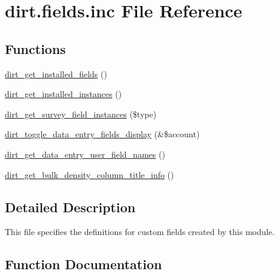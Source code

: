 \hypertarget{dirt_8fields_8inc}{}\section{dirt.\+fields.\+inc File Reference}
\label{dirt_8fields_8inc}
\subsection*{Functions}
\begin{DoxyCompactItemize}
\item 
\mbox{\hyperlink{dirt_8fields_8inc_a681957a0f276662e3fce712e5e14c11f}{dirt\+\_\+get\+\_\+installed\+\_\+fields}} ()
\item 
\mbox{\hyperlink{dirt_8fields_8inc_ad3d38e927006f5a6e57dd0016ead4d49}{dirt\+\_\+get\+\_\+installed\+\_\+instances}} ()
\item 
\mbox{\hyperlink{dirt_8fields_8inc_af0165a93ae54185d03d79d6a738fe204}{dirt\+\_\+get\+\_\+survey\+\_\+field\+\_\+instances}} (\$type)
\item 
\mbox{\hyperlink{dirt_8fields_8inc_ac3424e2d07f35121bba295a746a50fa5}{dirt\+\_\+toggle\+\_\+data\+\_\+entry\+\_\+fields\+\_\+display}} (\&\$account)
\item 
\mbox{\hyperlink{dirt_8fields_8inc_a2b6ec10e6817d4be9ac6788a657e05c1}{dirt\+\_\+get\+\_\+data\+\_\+entry\+\_\+user\+\_\+field\+\_\+names}} ()
\item 
\mbox{\hyperlink{dirt_8fields_8inc_a692d5032e38cf883af47b2cb9d5a5e4e}{dirt\+\_\+get\+\_\+bulk\+\_\+density\+\_\+column\+\_\+title\+\_\+info}} ()
\end{DoxyCompactItemize}


\subsection{Detailed Description}
This file specifies the definitions for custom fields created by this module. 

\subsection{Function Documentation}
\mbox{\label{dirt_8fields_8inc_a692d5032e38cf883af47b2cb9d5a5e4e}} 
